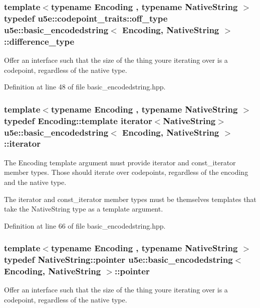 \subsubsection[{\texorpdfstring{difference\+\_\+type}{difference_type}}]{\setlength{\rightskip}{0pt plus 5cm}template$<$typename Encoding , typename Native\+String $>$ typedef {\bf u5e\+::codepoint\+\_\+traits\+::off\+\_\+type} {\bf u5e\+::basic\+\_\+encodedstring}$<$ Encoding, Native\+String $>$\+::{\bf difference\+\_\+type}}\hypertarget{classu5e_1_1basic__encodedstring_a73562c9a665a0bc4816bf79983dcfbb1}{}\label{classu5e_1_1basic__encodedstring_a73562c9a665a0bc4816bf79983dcfbb1}
Offer an interface such that the size of the thing you\textquotesingle{}re iterating over is a codepoint, regardless of the native type. 

Definition at line 48 of file basic\+\_\+encodedstring.\+hpp.

\subsubsection[{\texorpdfstring{iterator}{iterator}}]{\setlength{\rightskip}{0pt plus 5cm}template$<$typename Encoding , typename Native\+String $>$ typedef Encoding\+::template {\bf iterator}$<$Native\+String$>$ {\bf u5e\+::basic\+\_\+encodedstring}$<$ Encoding, Native\+String $>$\+::{\bf iterator}}\hypertarget{classu5e_1_1basic__encodedstring_a6657b5ba8bb502ff86626bffe324aae6}{}\label{classu5e_1_1basic__encodedstring_a6657b5ba8bb502ff86626bffe324aae6}
The Encoding template argument must provide iterator and const\+\_\+iterator member types. Those should iterate over codepoints, regardless of the encoding and the native type.

The iterator and const\+\_\+iterator member types must be themselves templates that take the Native\+String type as a template argument. 

Definition at line 66 of file basic\+\_\+encodedstring.\+hpp.

\subsubsection[{\texorpdfstring{pointer}{pointer}}]{\setlength{\rightskip}{0pt plus 5cm}template$<$typename Encoding , typename Native\+String $>$ typedef Native\+String\+::pointer {\bf u5e\+::basic\+\_\+encodedstring}$<$ Encoding, Native\+String $>$\+::{\bf pointer}}\hypertarget{classu5e_1_1basic__encodedstring_a623b4942f22b5976802f7745aae892cd}{}\label{classu5e_1_1basic__encodedstring_a623b4942f22b5976802f7745aae892cd}
Offer an interface such that the size of the thing you\textquotesingle{}re iterating over is a codepoint, regardless of the native type. 

